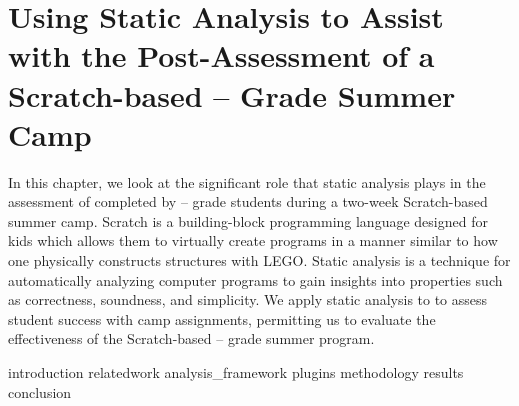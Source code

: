 \chapter{Using Static Analysis to Assist with the Post-Assessment of a
  Scratch-based -- Grade Summer Camp}
\label{chap:hairball}

In this chapter, we look at the significant role that static analysis plays in
the assessment of  completed by -- grade students
during a two-week Scratch-based summer camp. Scratch is a building-block
programming language designed for kids which allows them to virtually create
programs in a manner similar to how one physically constructs structures with
LEGO\textregistered{}. Static analysis is a technique for automatically
analyzing computer programs to gain insights into properties such as
correctness, soundness, and simplicity. We apply static analysis to
 to assess student success with camp assignments, permitting us to
evaluate the effectiveness of the Scratch-based -- grade summer
program.

\iffull
\def\currentprefix{hairball}
{introduction}
{relatedwork}
{analysis_framework}
{plugins}
{methodology}
{results}
{conclusion}
\fi
